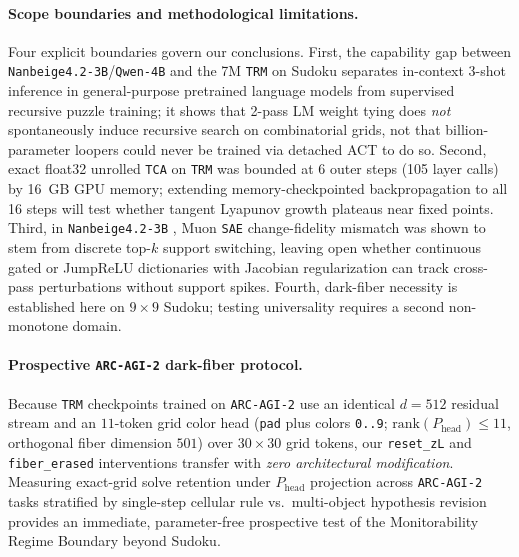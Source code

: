 \documentclass[10pt,letterpaper]{article}
\newcommand{\Phead}{P_{\mathrm{head}}}
\begin{document}
\paragraph{Scope boundaries and methodological limitations.} Four explicit boundaries govern our conclusions. First, the capability gap between \texttt{Nanbeige4.2-3B}/\texttt{Qwen-4B} and the 7M \texttt{TRM} on Sudoku separates in-context 3-shot inference in general-purpose pretrained language models from supervised recursive puzzle training; it shows that 2-pass LM weight tying does \emph{not} spontaneously induce recursive search on combinatorial grids, not that billion-parameter loopers could never be trained via detached ACT to do so. Second, exact float32 unrolled \texttt{TCA} on \texttt{TRM} was bounded at 6 outer steps (105 layer calls) by 16~GB GPU memory; extending memory-checkpointed backpropagation to all 16 steps will test whether tangent Lyapunov growth plateaus near fixed points. Third, in \texttt{Nanbeige4.2-3B} \cite{dugan2026vpd}, Muon \texttt{SAE} change-fidelity mismatch was shown to stem from discrete top-$k$ support switching, leaving open whether continuous gated or JumpReLU dictionaries with Jacobian regularization can track cross-pass perturbations without support spikes. Fourth, dark-fiber necessity is established here on $9\times 9$ Sudoku; testing universality requires a second non-monotone domain.

\paragraph{Prospective \texttt{ARC-AGI-2} dark-fiber protocol.} Because \texttt{TRM} checkpoints trained on \texttt{ARC-AGI-2} \cite{jolicoeur2025trm} use an identical $d=512$ residual stream and an $11$-token grid color head (\texttt{pad} plus colors \texttt{0..9}; $\mathrm{rank}(\Phead) \le 11$, orthogonal fiber dimension $501$) over $30\times 30$ grid tokens, our \texttt{reset\_zL} and \texttt{fiber\_erased} interventions transfer with \emph{zero architectural modification}. Measuring exact-grid solve retention under $\Phead$ projection across \texttt{ARC-AGI-2} tasks stratified by single-step cellular rule vs.\ multi-object hypothesis revision provides an immediate, parameter-free prospective test of the Monitorability Regime Boundary beyond Sudoku.



\end{document}

